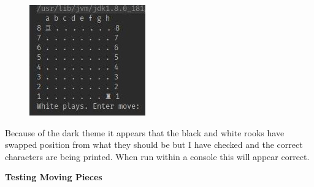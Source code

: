 \documentclass[a4paper]{article}
\begin{document}
\begin{figure}[h]
\centering
\includegraphics[scale=2.5]{screenshot1}
\end{figure}

Because of the dark theme it appears that the black and white rooks have swapped position from what they should be but I have checked and the correct characters are being printed. When run within a console this will appear correct. \newline

\noindent \textbf{Testing Moving Pieces}
\end{document}
